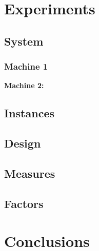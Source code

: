 \documentclass{DIKU-report}
\begin{document}
\vspace*{\fill}
\newpage
\addvspace{\bigskipamount}
\section*{Experiments}
\subsection*{System}

\subsubsection*{Machine 1}



\textbf{Machine 2:}


\subsection*{Instances}
\subsection*{Design}
\subsection*{Measures}
\subsection*{Factors}
\vspace*{\fill}
\newpage
\addvspace{\bigskipamount}
\section*{Conclusions}

%


\end{document}
